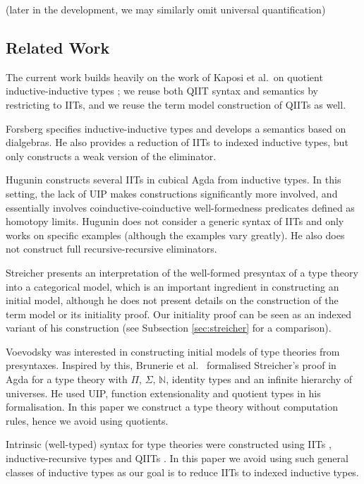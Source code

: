 \documentclass[a4paper,UKenglish,cleveref, autoref]{lipics-v2019}
\begin{document}
 (later in the development, we may similarly omit universal quantification)


\subsection{Related Work}

The current work builds heavily on the work of Kaposi et al.\ on quotient
inductive-inductive types \cite{Kaposi:2019:CQI:3302515.3290315}; we reuse both
QIIT syntax and semantics by restricting to IITs, and we reuse the term model
construction of QIITs as well.

Forsberg \cite{forsberg-phd} specifies inductive-inductive types and develops a
semantics based on dialgebras. He also provides a reduction of IITs to indexed
inductive types, but only constructs a weak version of the eliminator.

Hugunin \cite{jasper} constructs several IITs in cubical Agda from inductive
types. In this setting, the lack of UIP makes constructions significantly more
involved, and essentially involves coinductive-coinductive well-formedness
predicates defined as homotopy limits. Hugunin does not consider a generic
syntax of IITs and only works on specific examples (although the examples vary
greatly). He also does not construct full recursive-recursive eliminators.

Streicher \cite{streichersemantics} presents an interpretation of the well-formed
presyntax of a type theory into a categorical model, which is an important
ingredient in constructing an initial model, although he does not present
details on the construction of the term model or its initiality proof. Our initiality proof can be seen as an indexed variant of his construction (see Subsection \ref{sec:streicher} for a comparison).

Voevodsky was interested in constructing initial models of type
theories from presyntaxes. Inspired by this, Brunerie et al.\ \cite{brunerie}
formalised Streicher's proof in Agda for a type theory with $\Pi$,
$\Sigma$, $\mathbb{N}$, identity types and an infinite hierarchy of
universes. He used UIP, function extensionality and quotient types in
his formalisation. In this paper we construct a type theory without
computation rules, hence we avoid using quotients.

Intrinsic (well-typed) syntax for type theories were constructed using
IITs \cite{chapman09eatitself}, inductive-recursive types
\cite{nisse,Altenkirch:2014:CO:2631172.2631176} and QIITs
\cite{ttintt}. In this paper we avoid using such general classes of
inductive types as our goal is to reduce IITs to indexed inductive
types.
\end{document}

